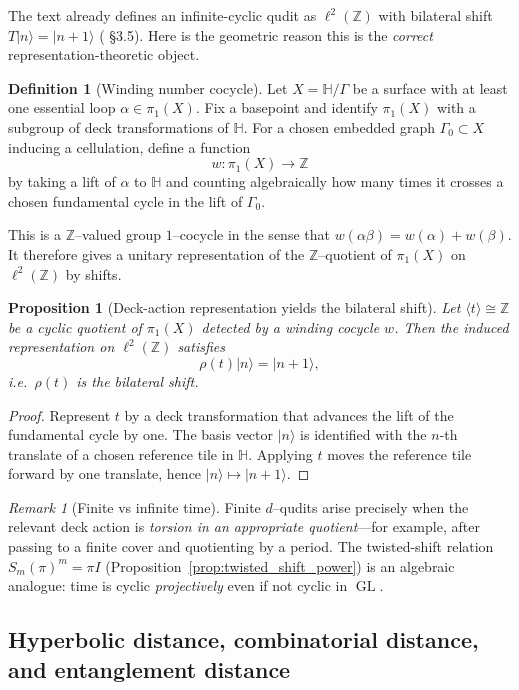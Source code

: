 \documentclass[11pt,oneside]{amsbook}
\numberwithin{equation}{section}
\theoremstyle{plain}
\newtheorem{proposition}[theorem]{Proposition}
\theoremstyle{definition}
\newtheorem{definition}[theorem]{Definition}
\theoremstyle{remark}
\newtheorem{remark}[theorem]{Remark}
\newcommand{\HH}{\mathbb{H}}
\newcommand{\Z}{\mathbb{Z}}
\DeclareMathOperator{\GL}{\mathrm{GL}}
\begin{document}
The  text already defines an infinite-cyclic qudit as $\ell^2(\Z)$ with bilateral shift $T|n\rangle=|n+1\rangle$ ( \S3.5).
Here is the geometric reason this is the \emph{correct} representation-theoretic object.

\begin{definition}[Winding number cocycle]
Let $X=\HH/\Gamma$ be a surface with at least one essential loop $\alpha\in\pi_1(X)$.
Fix a basepoint and identify $\pi_1(X)$ with a subgroup of deck transformations of $\HH$.
For a chosen embedded graph $\Gamma_0\subset X$ inducing a cellulation, define a function
\[
w:\pi_1(X)\to \Z
\]
by taking a lift of $\alpha$ to $\HH$ and counting algebraically how many times it crosses a chosen fundamental cycle in the lift of $\Gamma_0$.
\end{definition}

This is a $\Z$--valued group $1$--cocycle in the sense that $w(\alpha\beta)=w(\alpha)+w(\beta)$.
It therefore gives a unitary representation of the $\Z$--quotient of $\pi_1(X)$ on $\ell^2(\Z)$ by shifts.

\begin{proposition}[Deck-action representation yields the bilateral shift]
\label{prop:deck_shift}
Let $\langle t\rangle\cong \Z$ be a cyclic quotient of $\pi_1(X)$ detected by a winding cocycle $w$.
Then the induced representation on $\ell^2(\Z)$ satisfies
\[
\rho(t)|n\rangle = |n+1\rangle,
\]
i.e.\ $\rho(t)$ is the bilateral shift.
\end{proposition}

\begin{proof}
Represent $t$ by a deck transformation that advances the lift of the fundamental cycle by one.
The basis vector $|n\rangle$ is identified with the $n$-th translate of a chosen reference tile in $\HH$.
Applying $t$ moves the reference tile forward by one translate, hence $|n\rangle\mapsto |n+1\rangle$.
\end{proof}

\begin{remark}[Finite vs infinite time]
Finite $d$--qudits arise precisely when the relevant deck action is \emph{torsion in an appropriate quotient}---for example, after passing to a finite cover and quotienting by a period.
The twisted-shift relation $S_m(\pi)^m=\pi I$ (Proposition~\ref{prop:twisted_shift_power}) is an algebraic analogue: time is cyclic \emph{projectively} even if not cyclic in $\GL$.
\end{remark}

\subsection{Hyperbolic distance, combinatorial distance, and entanglement distance}
\label{sec:distances}
\end{document}
